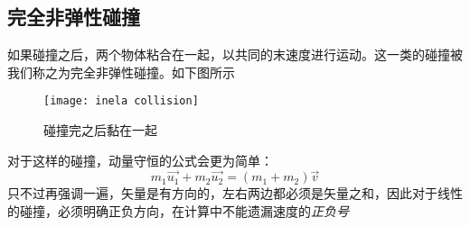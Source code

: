 \subsection*{完全非弹性碰撞}
如果碰撞之后，两个物体粘合在一起，以共同的末速度进行运动。这一类的碰撞被我们称之为完全非弹性碰撞。如下图所示
\begin{figure}[H]
\centering
\texttt{[image: inela collision]}
\caption{碰撞完之后黏在一起}
\end{figure}
对于这样的碰撞，动量守恒的公式会更为简单：
\[
	m_1\overrightarrow{u_1} +m_2\overrightarrow{u_2} =\left( m_1+m_2\right)\overrightarrow{v}
\]
只不过再强调一遍，矢量是有方向的，左右两边都必须是矢量之和，因此对于线性的碰撞，必须明确正负方向，在计算中不能遗漏速度的\emph{正负号}

